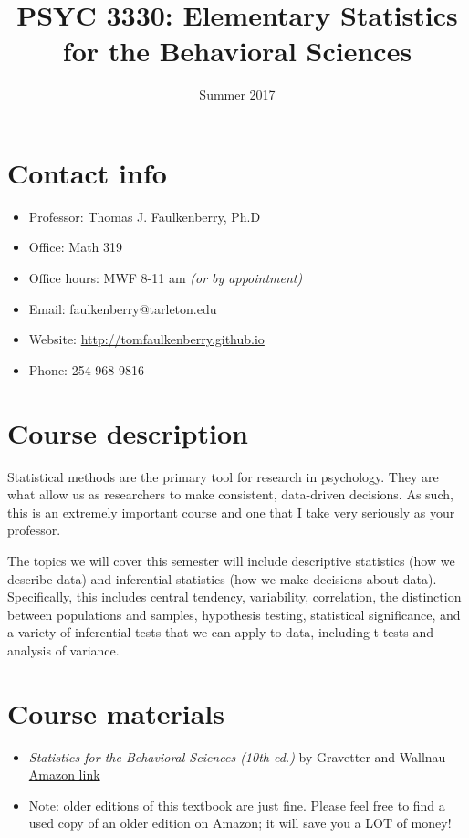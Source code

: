 \documentclass[10pt]{article}
\date{Summer 2017}
\title{PSYC 3330: Elementary Statistics for the Behavioral Sciences}
\begin{document}
\maketitle

\section*{Contact info}
\label{sec-1}
\begin{itemize}
\item Professor: Thomas J. Faulkenberry, Ph.D
\item Office: Math 319
\item Office hours: MWF 8-11 am \emph{(or by appointment)}
\item Email: faulkenberry@tarleton.edu
\item Website: \url{http://tomfaulkenberry.github.io}
\item Phone: 254-968-9816
\end{itemize}

\section*{Course description}
\label{sec-2}

Statistical methods are the primary tool for research in psychology.  
They are what allow us as researchers to make consistent, data-driven 
decisions.  As such, this is an extremely important course and one that I 
take very seriously as your professor.

The topics we will cover this semester will include descriptive statistics 
(how we describe data) and inferential statistics (how we make decisions 
about data).  Specifically, this includes central tendency, variability, 
correlation, the distinction between populations and samples, hypothesis 
testing, statistical significance, and a variety of inferential tests 
that we can apply to data, including t-tests and analysis of variance.

\section*{Course materials}
\label{sec-3}
\begin{itemize}
\item \emph{Statistics for the Behavioral Sciences (10th ed.)} by Gravetter and Wallnau \href{http://www.amazon.com/Statistics-Behavioral-Sciences-MindTap-Psychology/dp/1305504917/}{Amazon link}
\item Note:  older editions of this textbook are just fine.  Please feel free to find a used copy of an older edition on Amazon; it will save you a LOT of money!
\end{itemize}
\end{document}
